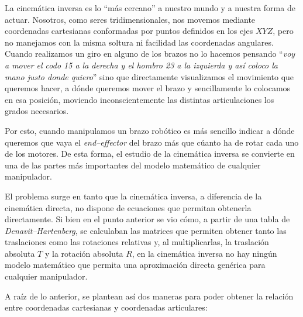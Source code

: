 La cinemática inversa es lo ``más cercano'' a nuestro mundo y a nuestra forma de actuar.
Nosotros, como seres tridimensionales, nos movemos mediante coordenadas cartesianas
conformadas por puntos definidos en los ejes $XYZ$, pero no manejamos con la misma
soltura ni facilidad las coordenadas angulares. Cuando realizamos un giro en alguno
de los brazos no lo hacemos pensando ``\textit{voy a mover el codo
15\textdegree{} a la derecha y el hombro 23\textdegree{} a la izquierda y así coloco la
mano justo donde quiero}'' sino que directamente visualizamos el movimiento que queremos
hacer, a dónde queremos mover el brazo y sencillamente lo colocamos en esa posición,
moviendo inconscientemente las distintas articulaciones los grados necesarios.

Por esto, cuando manipulamos un brazo robótico es más sencillo indicar a dónde queremos
que vaya el \textit{end--effector} del brazo más que cúanto ha de rotar cada uno de los
motores. De esta forma, el estudio de la cinemática inversa se convierte en una de las
partes más importantes del modelo matemático de cualquier manipulador.

El problema surge en tanto que la cinemática inversa, a diferencia de la cinemática
directa, no dispone de ecuaciones que permitan obtenerla directamente. Si bien en el
punto anterior se vio cómo, a partir de una tabla de \textit{Denavit--Hartenberg},
se calculaban las matrices que permiten obtener tanto las traslaciones como las rotaciones
relativas y, al multiplicarlas, la traslación absoluta $T$ y la rotación absoluta $R$,
en la cinemática inversa no hay ningún modelo matemático que permita una aproximación 
directa genérica para cualquier manipulador.

A raíz de lo anterior, se plantean así dos maneras para poder obtener la relación entre
coordenadas cartesianas y coordenadas articulares:

